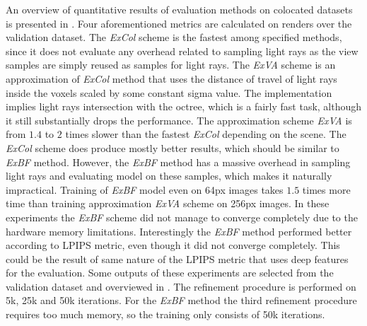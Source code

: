 An overview of quantitative results of evaluation methods on colocated datasets is presented in .
Four aforementioned metrics are calculated on renders over the validation dataset.
The \textit{ExCol} scheme is the fastest among specified methods,
since it does not evaluate any overhead related to sampling light rays
as the view samples are simply reused as samples for light rays.
The \textit{ExVA} scheme is an approximation of \textit{ExCol} method
that uses the distance of travel of light rays inside the voxels scaled by some constant sigma value.
The implementation implies light rays intersection with the octree,
which is a fairly fast task, although it still substantially drops the performance.
The approximation scheme \textit{ExVA} is from $1.4$ to $2$ times slower
than the fastest \textit{ExCol} depending on the scene.
The \textit{ExCol} scheme does produce mostly better results,
which should be similar to \textit{ExBF} method.
However, the \textit{ExBF} method has a massive overhead in sampling light rays
and evaluating model on these samples,
which makes it naturally impractical.
Training of \textit{ExBF} model even on 64px images takes $1.5$ times more time
than training approximation \textit{ExVA} scheme on 256px images.
In these experiments the \textit{ExBF} scheme did not manage
to converge completely due to the hardware memory limitations.
Interestingly the \textit{ExBF} method performed better according to
LPIPS metric, even though it did not converge completely.
This could be the result of same nature of the LPIPS metric
that uses deep features for the evaluation.
Some outputs of these experiments are selected from the validation dataset
and overviewed in .
The refinement procedure is performed on 5k, 25k and 50k iterations.
For the \textit{ExBF} method the third refinement procedure requires too much memory,
so the training only consists of 50k iterations.





